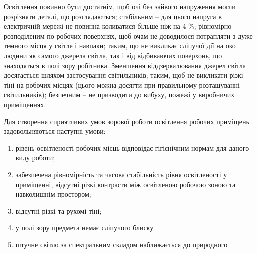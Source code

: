 Освітлення повинно бути достатнім, щоб очі без зайвого напруження могли розрізняти деталі, що розглядаються; стабільним – для цього напруга в електричній мережі не повинна коливатися більше ніж на 4 \%; рівномірно розподіленим по робочих поверхнях, щоб очам не доводилося потрапляти з дуже темного місця у світле і навпаки; таким, що не викликає сліпучої дії на око людини як самого джерела світла, так і від відбиваючих поверхонь, що знаходяться в полі зору робітника. 
Зменшення віддзеркалювання джерел світла досягається шляхом застосування світильників; 
таким, щоб не викликати різкі тіні на робочих місцях (цього можна досягти при правильному розташуванні світильників); 
безпечним – не призводити до вибуху, пожежі у виробничих приміщеннях.

Для створення сприятливих умов зорової роботи освітлення робочих приміщень задовольняються наступні умови:
\begin{enumerate}
 \item рівень освітленості робочих місць відповідає гігієнічним нормам для даного виду роботи;
 \item забезпечена рівномірність та часова стабільність рівня освітленості у приміщенні, відсутні різкі контрасти між освітленою робочою зоною та навколишнім простором;
 \item відсутні різкі та рухомі тіні;
 \item у полі зору предмета немає сліпучого блиску
 \item штучне світло за спектральним складом наближається до природного
\end{enumerate}

